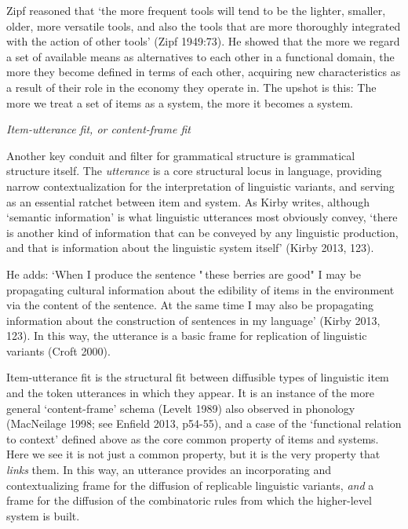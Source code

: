 Zipf reasoned that \textquoteleft the more frequent tools will tend to be the lighter, 
smaller, older, more versatile tools, and also the tools that are more 
thoroughly integrated with the action of other tools' (Zipf 1949:73). He 
showed that the more we regard a set of available means as alternatives 
to each other in a functional domain, the more they become defined in 
terms of each other, acquiring new characteristics as a result of their 
role in the economy they operate in. The upshot is this: The more we 
treat a set of items as a system, the more it becomes a system.



\textit{Item-utterance fit, or content-frame fit}



Another key conduit and filter for grammatical structure is grammatical 
structure itself. The \textit{utterance }is a core structural locus in 
language, providing narrow contextualization for the interpretation of 
linguistic variants, and serving as an essential ratchet between item 
and system. As Kirby writes, although \textquoteleft semantic information' is what 
linguistic utterances most obviously convey, \textquoteleft there is another kind of 
information that can be conveyed by any linguistic production, and that 
is information about the linguistic system itself' (Kirby 2013, 123). 



He adds: \textquoteleft When I produce the sentence "\,these berries are good" I may 
be propagating cultural information about the edibility of items in the 
environment via the content of the sentence. At the same time I may also 
be propagating information about the construction of sentences in my 
language' (Kirby 2013, 123). In this way, the utterance is a basic frame 
for replication of linguistic variants (Croft 2000). 



Item-utterance fit is the structural fit between diffusible types of 
linguistic item and the token utterances in which they appear. It is an 
instance of the more general \textquoteleft content-frame' schema (Levelt 1989) also 
observed in phonology (MacNeilage 1998; see Enfield 2013, p54-55), and a 
case of the \textquoteleft functional relation to context' defined above as the core 
common property of items and systems. Here we see it is not just a 
common property, but it is the very property that \textit{links }them. 
In this way, an utterance provides an incorporating and contextualizing 
frame for the diffusion of replicable linguistic variants, \textit{and
} a frame for the diffusion of the combinatoric rules from which the 
higher-level system is built. 



